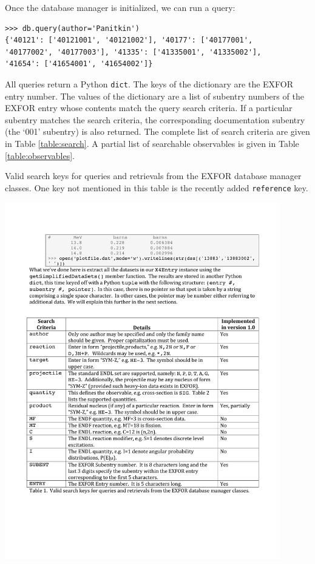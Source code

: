 \documentclass[11pt]{article}
\begin{document}
Once the database manager is initialized, we can run a query:
\begin{verbatim}
>>> db.query(author='Panitkin')
{'40121': ['40121001', '40121002'], '40177': ['40177001',
'40177002', '40177003'], '41335': ['41335001', '41335002'],
'41654': ['41654001', '41654002']}
\end{verbatim}
All queries return a Python \texttt{dict}.  The keys of the dictionary are the EXFOR entry number.  The values of the dictionary are a list of subentry numbers of the EXFOR entry whose contents match the query search criteria.  If a particular subentry matches the search criteria, the corresponding documentation subentry  (the `001' subentry) is also returned.  The complete list of search criteria  are given in Table \ref{table:search}.  A partial list of searchable observables is given in Table \ref{table:observables}.

\begin{table}
\caption{Valid search keys for queries and retrievals from the EXFOR database manager classes.  One key not mentioned in this table is the recently added \texttt{reference} key.}
\begin{center}
\includegraphics[width=0.9\textwidth]{tables/table1}
\end{center}
\label{table:search}
\end{table}%
\end{document}
